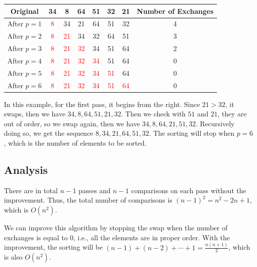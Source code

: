 \begin{table}[H]
  \centering
  \begin{tabular}{c|c c c c c c|c}
    \toprule
    Original & 34 & 8 & 64 & 51 & 32 & 21 & Number of Exchanges  \\
    \midrule
    After \(p = 1\) & \textcolor{red}{8} & 34 & 21 & 64 & 51 & 32 & 4  \\
    \midrule
    After \(p = 2\) & \textcolor{red}{8} & \textcolor{red}{21} & 34 & 32 & 64 & 51 & 3  \\
    \midrule
    After \(p = 3\) & \textcolor{red}{8} & \textcolor{red}{21} & \textcolor{red}{32} & 34 & 51 & 64 & 2  \\
    \midrule
    After \(p = 4\) & \textcolor{red}{8} & \textcolor{red}{21} & \textcolor{red}{32} & \textcolor{red}{34} & 51 & 64 & 0  \\
    \midrule
    After \(p = 5\) & \textcolor{red}{8} & \textcolor{red}{21} & \textcolor{red}{32} & \textcolor{red}{34} & \textcolor{red}{51} & 64 & 0  \\
    \midrule
    After \(p = 6\) & \textcolor{red}{8} & \textcolor{red}{21} & \textcolor{red}{32} & \textcolor{red}{34} & \textcolor{red}{51} & \textcolor{red}{64} & 0  \\
    \bottomrule
  \end{tabular}
\end{table}

In this example, for the first pass, it begins from the right. Since \(21 > 32\), it swaps, then we have \(34, 8, 64, 51, 21, 32\). Then we check with \(51\) and \(21\), they are out of order, so we swap again, then we have \(34, 8, 64, 21, 51, 32\). Recursively doing so, we get the sequence \(8, 34, 21, 64, 51, 32\). The sorting will stop when \(p = 6\), which is the number of elements to be sorted.

\subsection{Analysis}
There are in total \(n - 1\) passes and \(n - 1\) comparisons on each pass without the improvement. Thus, the total number of comparisons is \((n - 1)^2 = n^2 - 2n + 1\), which is \(O(n^2)\). 

We can improve this algorithm by stopping the swap when the number of exchanges is equal to 0, i.e., all the elements are in proper order. With the improvement, the sorting will be \((n - 1) + (n - 2) + \cdots + 1 = \frac{n(n + 1)}{2}\), which is also \(O(n^2)\).

